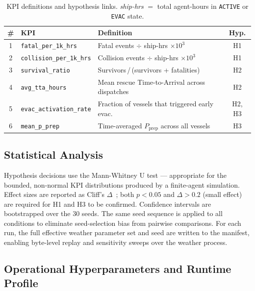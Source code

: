 \documentclass[cameraready]{Interspeech}
\begin{document}
\begin{table}[htbp]
    \caption{KPI definitions and hypothesis links. \textit{ship-hrs} $=$ total agent-hours in \texttt{ACTIVE} or \texttt{EVAC} state.}
    \label{tab:kpis}
    \centering
    \small
    \begin{tabularx}{\columnwidth}{@{}clXc@{}}
        \toprule
        \# & KPI & Definition & Hyp. \\
        \midrule
        1 & \texttt{fatal\_per\_1k\_hrs}
        & Fatal events $\div$ ship-hrs $\times 10^3$
        & H1 \\
        2 & \texttt{collision\_per\_1k\_hrs}
        & Collision events $\div$ ship-hrs $\times 10^3$
        & H1 \\
        3 & \texttt{survival\_ratio}
        & Survivors\,/\,(survivors + fatalities)
        & H2 \\
        4 & \texttt{avg\_tta\_hours}
        & Mean rescue Time-to-Arrival across dispatches
        & H2 \\
        5 & \texttt{evac\_activation\_rate}
        & Fraction of vessels that triggered early evac.
        & H2, H3 \\
        6 & \texttt{mean\_p\_prep}
        & Time-averaged $P_\text{prep}$ across all vessels
        & H3 \\
        \bottomrule
    \end{tabularx}
\end{table}

\subsection{Statistical Analysis}

Hypothesis decisions use the Mann-Whitney U test --- appropriate for the bounded, non-normal KPI distributions produced by a finite-agent simulation. Effect sizes are reported as Cliff's $\Delta$~\cite{cliff1993}; both $p < 0.05$ and $\Delta > 0.2$ (small effect) are required for H1 and H3 to be confirmed. Confidence intervals are bootstrapped over the 30 seeds. The same seed sequence is applied to all conditions to eliminate seed-selection bias from pairwise comparisons. For each run, the full effective weather parameter set and seed are written to the manifest, enabling byte-level replay and sensitivity sweeps over the weather process.

\subsection{Operational Hyperparameters and Runtime Profile}
\end{document}
